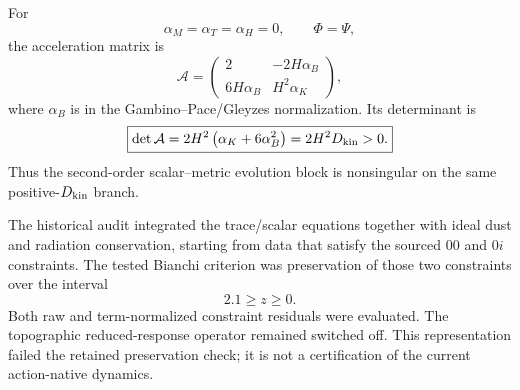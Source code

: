 For
\[
\alpha_M=\alpha_T=\alpha_H=0,\qquad
\Phi=\Psi,
\]
the acceleration matrix is
\[
\boxed{
\mathcal A
=
\begin{pmatrix}
2 & -2H\alpha_B\\
6H\alpha_B & H^2\alpha_K
\end{pmatrix},
}
\]
where \(\alpha_B\) is in the Gambino--Pace/Gleyzes normalization. Its determinant is
\[
\boxed{
\det\mathcal A
=
2H^2\left(\alpha_K+6\alpha_B^2\right)
=
2H^2D_{\rm kin}>0.
}
\]
Thus the second-order scalar--metric evolution block is nonsingular on the same positive-\(D_{\rm kin}\) branch.

The historical audit integrated the trace/scalar equations together with ideal dust and radiation conservation, starting from data that satisfy the sourced \(00\) and \(0i\) constraints. The tested Bianchi criterion was preservation of those two constraints over the interval
\[
2.1\ge z\ge0.
\]
Both raw and term-normalized constraint residuals were evaluated. The topographic reduced-response operator remained switched off. This representation failed the retained preservation check; it is not a certification of the current action-native dynamics.
